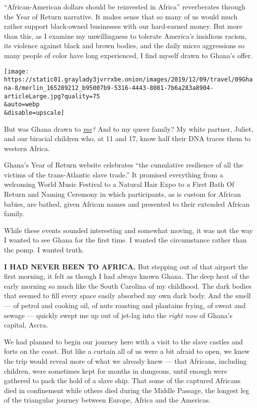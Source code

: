 ``African-American dollars should be reinvested in Africa'' reverberates
through the Year of Return narrative. It makes sense that so many of us
would much rather support black-owned businesses with our hard-earned
money. But more than this, as I examine my unwillingness to tolerate
America's insidious racism, its violence against black and brown bodies,
and the daily micro aggressions so many people of color have long
experienced, I find myself drawn to Ghana's offer.

\texttt{[image: https://static01.graylady3jvrrxbe.onion/images/2019/12/09/travel/09Ghana-8/merlin\_165289212\_b95007b9-5316-4443-8081-7b6a283a8904-articleLarge.jpg?quality=75\\\&auto=webp\\\&disable=upscale]}

But was Ghana drawn to
\href{https://www.jacquelinewoodson.com/all-about-me/my-biography/}{\emph{me}}\emph{?}
And to my queer family? My white partner, Juliet, and our biracial
children who, at 11 and 17, know half their DNA traces them to western
Africa.

Ghana's Year of Return website celebrates ``the cumulative resilience of
all the victims of the trans-Atlantic slave trade.'' It promised
everything from a welcoming World Music Festival to a Natural Hair Expo
to a First Bath Of Return and Naming Ceremony in which participants, as
is custom for African babies, are bathed, given African names and
presented to their extended African family.

While these events sounded interesting and somewhat moving, it was not
the way I wanted to see Ghana for the first time. I wanted the
circumstance rather than the pomp. I wanted truth.

\textbf{I HAD NEVER BEEN TO AFRICA.} But stepping out of that airport
the first morning, it felt as though I had always known Ghana. The deep
heat of the early morning so much like the South Carolina of my
childhood. The dark bodies that seemed to fill every space easily
absorbed my own dark body. And the smell --- of petrol and cooking oil,
of nuts roasting and plantains frying, of sweat and sewage --- quickly
swept me up out of jet-lag into the \emph{right now} of Ghana's capital,
Accra.

We had planned to begin our journey here with a visit to the slave
castles and forts on the coast. But like a curtain all of us were a bit
afraid to open, we knew the trip would reveal more of what we already
knew --- that Africans, including children, were sometimes kept for
months in dungeons, until enough were gathered to pack the hold of a
slave ship. That some of the captured Africans died in confinement while
others died during the Middle Passage, the longest leg of the triangular
journey between Europe, Africa and the Americas.

